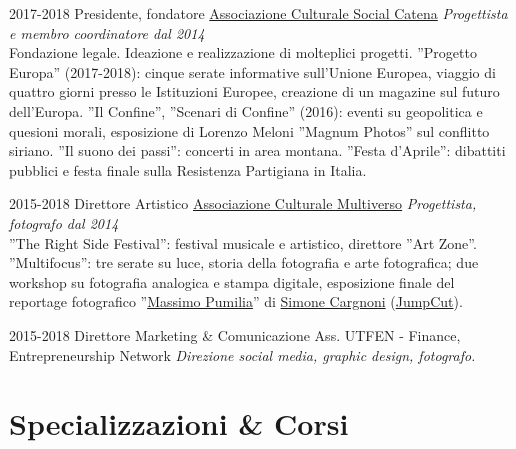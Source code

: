 \documentclass[]{friggeri-cv}
\begin{document}
\begin{entrylist}

\entry
    {2017-2018}
    {Presidente, fondatore}
    {\href{https://www.facebook.com/SocialCatena/}{Associazione Culturale Social Catena}}
    {\emph{Progettista e membro coordinatore dal 2014}\\
    Fondazione legale. Ideazione e realizzazione di molteplici progetti. ''Progetto Europa'' (2017-2018): cinque serate informative sull'Unione Europea, viaggio di quattro giorni presso le Istituzioni Europee, creazione di un magazine sul futuro dell'Europa. ''Il Confine'', ''Scenari di Confine'' (2016): eventi su geopolitica e quesioni morali, esposizione di Lorenzo Meloni ''Magnum Photos'' sul conflitto siriano. ''Il suono dei passi'': concerti in area montana. ''Festa d’Aprile'': dibattiti pubblici e festa finale sulla Resistenza Partigiana in Italia.
    }

\entry
    {2015-2018}
    {Direttore Artistico}
    {\href{https://www.facebook.com/Asso.Multiverso/}{Associazione Culturale Multiverso}}
    {\emph{Progettista, fotografo dal 2014}\\
    ''The Right Side Festival'': festival musicale e artistico, direttore ''Art Zone''. ''Multifocus'': tre serate su luce, storia della fotografia e arte fotografica; due workshop su fotografia analogica e stampa digitale, esposizione finale del reportage fotografico ''\href{http://simonecargnoni.com/massimopumilia/}{Massimo Pumilia}'' di \href{http://simonecargnoni.com}{Simone Cargnoni} (\href{http://www.jumpcut.it}{JumpCut}).
    }

\entry
    {2015-2018}
    {Direttore Marketing \& Comunicazione}
    {Ass. UTFEN - Finance, Entrepreneurship Network}
    {\emph{Direzione social media, graphic design, fotografo.}}

\end{entrylist}


\section{Specializzazioni \& Corsi}
\end{document}
